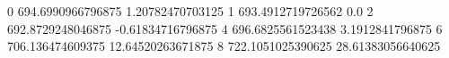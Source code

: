 0 694.6990966796875 1.20782470703125
1 693.4912719726562 0.0
2 692.8729248046875 -0.61834716796875
4 696.6825561523438 3.1912841796875
6 706.136474609375 12.64520263671875
8 722.1051025390625 28.61383056640625
